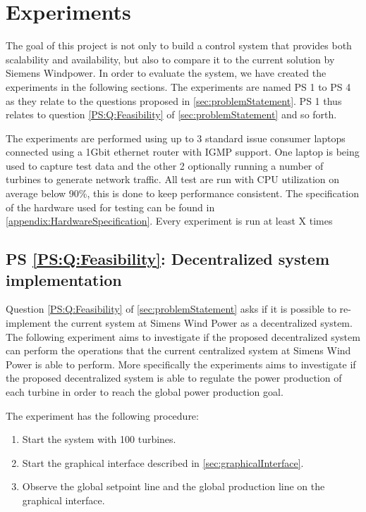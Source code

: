
\chapter{Experiments}\label{cha:experiments}

\newcommand{\failingTurbineNumbers}{1, 5, 10 and 30}
\newcommand{\testTurbineNumbers}{2, 21, 41, 61, 81 and 101}
\newcommand{\testCycletimeNumbers}{5ms, 10ms, 15ms, 20ms, 25ms and 30ms}
\newcommand{\experiemntRunTime}{2mins}

The goal of this project is not only to build a control system that provides both scalability and availability, but also to compare it to the current solution by Siemens Windpower. 
In order to evaluate the system, we have created the experiments in the following sections. 
The experiments are named PS 1 to PS 4 as they relate to the questions proposed in \cref{sec:problemStatement}.
PS 1 thus relates to question \ref{PS:Q:Feasibility} of \cref{sec:problemStatement} and so forth.

The experiments are performed using up to 3 standard issue consumer laptops connected using a 1Gbit ethernet router with IGMP support.
One laptop is being used to capture test data and the other 2 optionally running a number of turbines to generate network traffic.
All test are run with CPU utilization on average below 90\%, this is done to keep performance consistent.
The specification of the hardware used for testing can be found in \cref{appendix:HardwareSpecification}.
Every experiment is run at least X times 

\section{PS \ref{PS:Q:Feasibility}: Decentralized system implementation}

Question \ref{PS:Q:Feasibility} of \cref{sec:problemStatement} asks if it is possible to re-implement the current system at Simens Wind Power as a decentralized system. The following experiment aims to investigate if the proposed decentralized system can perform the operations that the current centralized system at Simens Wind Power is able to perform. More specifically the experiments aims to investigate if the proposed decentralized system is able to regulate the power production of each turbine in order to reach the global power production goal.

The experiment has the following procedure:
\begin{enumerate}
	\item Start the system with 100 turbines.
	\item Start the graphical interface described in \cref{sec:graphicalInterface}.
	\item Observe the global setpoint line and the global production line on the graphical interface.
\end{enumerate}


